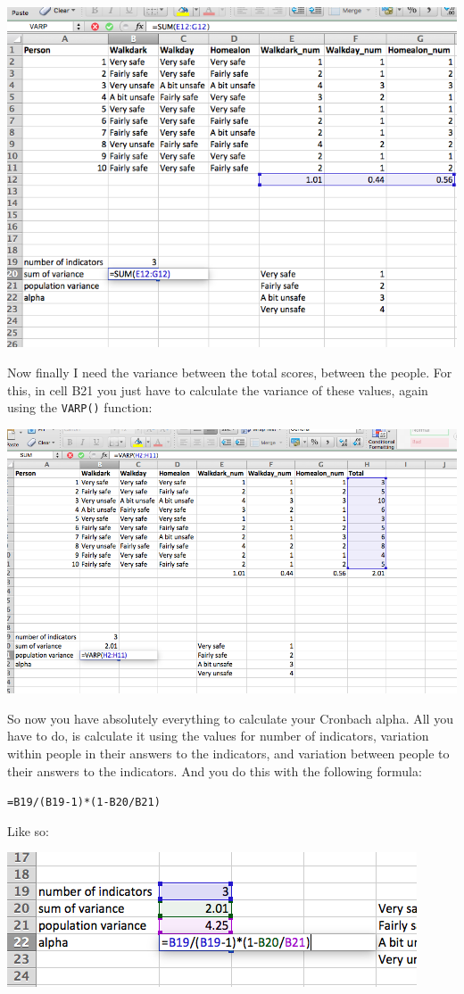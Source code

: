 \documentclass[]{book}
\theoremstyle{definition}
\theoremstyle{definition}
\theoremstyle{definition}
\theoremstyle{remark}
\begin{document}
\includegraphics{imgs/sum_var_alpha.png}

Now finally I need the variance between the total scores, between the
people. For this, in cell B21 you just have to calculate the variance of
these values, again using the \texttt{VARP()} function:

\includegraphics{imgs/pop_var_alpha.png}

So now you have absolutely everything to calculate your Cronbach alpha.
All you have to do, is calculate it using the values for number of
indicators, variation within people in their answers to the indicators,
and variation between people to their answers to the indicators. And you
do this with the following formula:

\texttt{=B19/(B19-1)*(1-B20/B21)}

Like so:

\includegraphics{imgs/final_calc_alpha.png}
\end{document}

